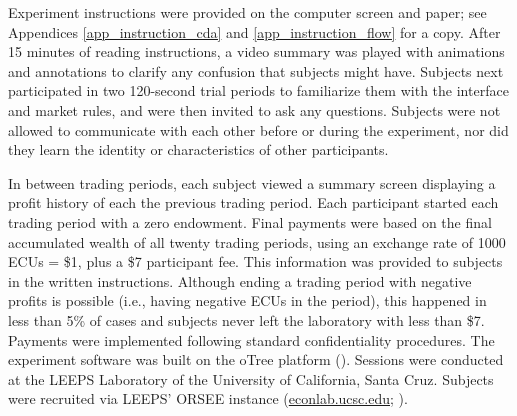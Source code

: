 Experiment instructions were provided on the computer screen and paper; see Appendices \ref{app_instruction_cda} and \ref{app_instruction_flow} for a copy. %
After 15 minutes of reading instructions, a video summary was played with animations and annotations to clarify any confusion that subjects might have.
Subjects next participated in two 120-second trial periods to familiarize them with the interface and market rules, and were then invited to ask any questions.
Subjects were not allowed to communicate with each other before or during the experiment, nor did they learn the identity or characteristics of other participants.

In between trading periods, each subject viewed a summary screen displaying a profit history of each the previous trading period.
Each participant started each trading period with a zero endowment. Final payments were based on the final accumulated wealth of all twenty trading periods, using an exchange rate of 1000 ECUs = \$1, plus a \$7 participant fee. This information was provided to subjects in the written instructions.
Although ending a trading period with negative profits is possible (i.e., having negative ECUs in the period), this happened in less than 5\% of cases
and subjects never left the laboratory with less than \$7. Payments were implemented following standard confidentiality procedures. 
The experiment software was built on the oTree platform (\cite{otree}). Sessions were conducted at the LEEPS Laboratory of the University of California, Santa Cruz. Subjects were recruited via LEEPS' ORSEE instance (\hyperlink{https://econlab.ucsc.edu/public/}{econlab.ucsc.edu}; \cite{subject}).



